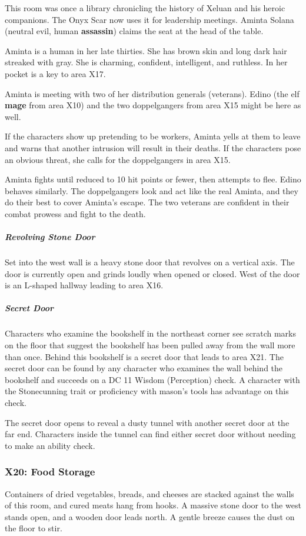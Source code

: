 \documentclass[10pt,a4paper,twoside,bg=print,twocolumn,openany,nodeprecatedcode]{dndbook}
\begin{document}
This room was once a library chronicling the history of Xeluan and his heroic companions. The Onyx Scar now uses it for leadership meetings. Aminta Solana (neutral evil, human \textbf{assassin}) claims the seat at the head of the table.

Aminta is a human in her late thirties. She has brown skin and long dark hair streaked with gray. She is charming, confident, intelligent, and ruthless. In her pocket is a key to area X17.

Aminta is meeting with two of her distribution generals (veterans). Edino (the elf \textbf{mage} from area X10) and the two doppelgangers from area X15 might be here as well.

If the characters show up pretending to be workers, Aminta yells at them to leave and warns that another intrusion will result in their deaths. If the characters pose an obvious threat, she calls for the doppelgangers in area X15.

Aminta fights until reduced to 10 hit points or fewer, then attempts to flee. Edino behaves similarly. The doppelgangers look and act like the real Aminta, and they do their best to cover Aminta's escape. The two veterans are confident in their combat prowess and fight to the death.

\subparagraph{Revolving Stone Door}
Set into the west wall is a heavy stone door that revolves on a vertical axis. The door is currently open and grinds loudly when opened or closed. West of the door is an L-shaped hallway leading to area X16.

\subparagraph{Secret Door}
Characters who examine the bookshelf in the northeast corner see scratch marks on the floor that suggest the bookshelf has been pulled away from the wall more than once. Behind this bookshelf is a secret door that leads to area X21. The secret door can be found by any character who examines the wall behind the bookshelf and succeeds on a DC 11 Wisdom (Perception) check. A character with the Stonecunning trait or proficiency with mason's tools has advantage on this check.

The secret door opens to reveal a dusty tunnel with another secret door at the far end. Characters inside the tunnel can find either secret door without needing to make an ability check.

\subsubsection{X20: Food Storage}
\begin{DndReadAloud}{}
Containers of dried vegetables, breads, and cheeses are stacked against the walls of this room, and cured meats hang from hooks. A massive stone door to the west stands open, and a wooden door leads north. A gentle breeze causes the dust on the floor to stir.

\end{DndReadAloud}
\end{document}

